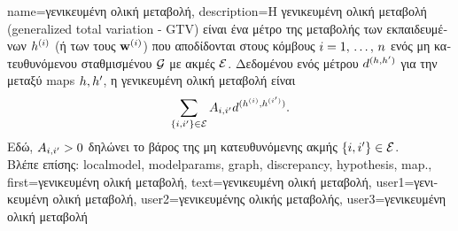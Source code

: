 {name={\foreignlanguage{greek}{γενικευμένη ολική μεταβολή}}, 
	description={\foreignlanguage{greek}{Η γενικευμένη ολική μεταβολή} (generalized total variation - GTV) 
		\foreignlanguage{greek}{είναι ένα μέτρο της μεταβολής των εκπαιδευμένων} 
		 $h^{(i)}$ (\foreignlanguage{greek}{ή των}  
		\foreignlanguage{greek}{τους} $\mathbf{w}^{(i)}$) \foreignlanguage{greek}{που αποδίδονται στους κόμβους 
		$i=1, \,\ldots, \,n$ ενός μη κατευθυνόμενου σταθμισμένου}  $\mathcal{G}$ 
		\foreignlanguage{greek}{με ακμές $\mathcal{E}$. Δεδομένου ενός μέτρου $d^{(h,h')}$ 
		για την}  \foreignlanguage{greek}{μεταξύ} \gls{map}s  
		$h,h'$, \foreignlanguage{greek}{η γενικευμένη ολική μεταβολή είναι}
		\begin{equation} 
			\nonumber
			\sum_{\{i,i'\}\in \mathcal{E}} A_{i,i'} 
			d^{(h^{(i)},h^{(i')})}.
		\end{equation}
		\foreignlanguage{greek}{Εδώ, $A_{i,i'}>0$ δηλώνει το βάρος της μη κατευθυνόμενης ακμής} 
		$\{i,i'\}\in \mathcal{E}$. \\
		\foreignlanguage{greek}{Βλέπε επίσης:} \gls{localmodel}, \glspl{modelparam}, \gls{graph}, \gls{discrepancy}, \gls{hypothesis}, \gls{map}.},
	first={\foreignlanguage{greek}{γενικευμένη ολική μεταβολή}},
	text={\foreignlanguage{greek}{γενικευμένη ολική μεταβολή}},
	user1={\foreignlanguage{greek}{γενικευμένη ολική μεταβολή}}, %
  	user2={\foreignlanguage{greek}{γενικευμένης ολικής μεταβολής}}, %
	user3={\foreignlanguage{greek}{γενικευμένη ολική μεταβολή}} %
}

